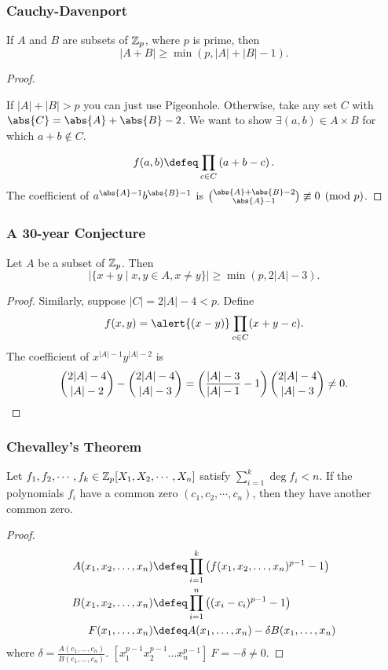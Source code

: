 \documentclass{beamer}
\theoremstyle{definition}
\begin{document}
\begin{frame}
  \frametitle{Cauchy-Davenport}
  \begin{theorem}
    If $A$ and $B$ are subsets of $\mathbb Z_p$, where $p$ is prime, then \[ |A+B| \ge \min(p, |A| + |B| - 1). \]
  \end{theorem}
  \pause
  \begin{proof}
    \begin{itemize}
      \ii If $\left\lvert A \right\rvert + \left\lvert B \right\rvert > p$ you can just use Pigeonhole. \pause
      \ii Otherwise, take any set $C$ with $\abs{C} = \abs{A} + \abs{B} - 2$.  We want to show $\exists (a,b) \in A \times B$ for which $a+b \notin C$.
    \end{itemize}
    \pause
    \[ f(a,b) \defeq \prod_{c \in C} \left( a+b-c \right). \]
    \pause
    The coefficient of $a^{\abs{A}-1}b^{\abs{B}-1}$ is $\binom{\abs{A} + \abs{B} - 2}{\abs{A} - 1} \not\equiv 0 \pmod{p}$.
  \end{proof}
\end{frame}

\begin{frame}
  \frametitle{A 30-year Conjecture}
  \begin{theorem}
    Let $A$ be a subset of $\mathbb Z_p$.  Then \[ |\{x+y \mid x,y \in A, x \neq y \} | \ge \min(p, 2|A|-3). \]
  \end{theorem}
  \pause
  \begin{proof}
    Similarly, suppose $\left\lvert C \right\rvert = 2\left\lvert A \right\rvert - 4 < p$.  Define
    \[ f(x,y) = \alert{(x-y)} \prod_{c \in C} (x+y-c). \]
    \pause
    The coefficient of $x^{|A|-1}y^{|A|-2}$ is \[ \binom{2|A|-4}{|A|-2} - \binom{2|A|-4}{|A|-3} = \left( \frac{|A|-3}{|A|-1} - 1 \right)\binom{2|A|-4}{|A|-3} \neq 0. \qedhere \]
  \end{proof}
\end{frame}

\begin{frame}
  \frametitle{Chevalley's Theorem}
  \begin{corollary}[Chevalley, 1935]
    Let $f_1,f_2,\cdots,f_k \in \mathbb Z_p[X_1,X_2,\cdots,X_n]$ satisfy $\sum_{i=1}^k \deg f_i < n$.  If the polynomials $f_i$ have a common zero $(c_1,c_2,\cdots,c_n)$, then they have another common zero.
  \end{corollary}
  \pause
  \begin{proof}
    \vspace*{-1.4em}
    \begin{align*}
      A(x_1,x_2,\dots,x_n) &\defeq \prod_{i=1}^k \left( f(x_1,x_2,\dots,x_n)^{p-1}-1 \right) \\
      B(x_1,x_2,\dots,x_n) &\defeq \prod_{i=1}^n \left( (x_i-c_i)^{p-1}-1 \right) \\
      F(x_1,\dots,x_n) &\defeq A(x_1,\dots,x_n) - \delta B(x_1,\dots,x_n)
    \end{align*}
    where $\delta = \frac{A(c_1,\dots,c_n)}{B(c_1,\dots,c_n)}$. \pause
    $[x_1^{p-1}x_2^{p-1}\dots x_n^{p-1}] \ F = -\delta \neq 0$.
  \end{proof}
\end{frame}
\end{document}
